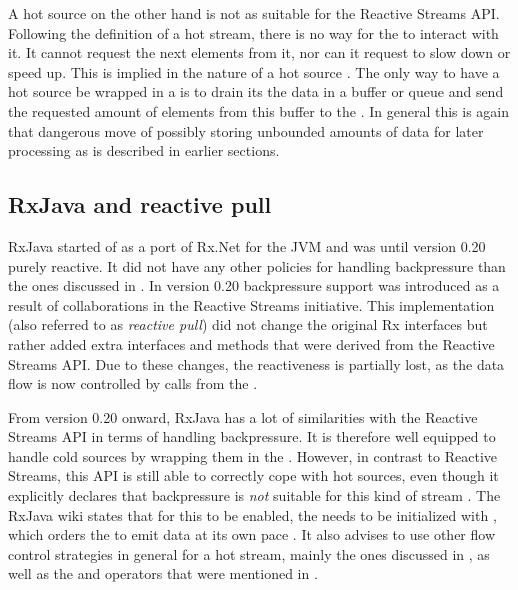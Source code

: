 A hot source on the other hand is not as suitable for the Reactive Streams API. Following the definition of a hot stream, there is no way for the  to interact with it. It cannot request the next  elements from it, nor can it request to slow down or speed up. This is implied in the nature of a hot source \cite{berry1991-Reactive}. The only way to have a hot source be wrapped in a  is to drain its the data in a buffer or queue and send the requested amount of elements from this buffer to the . In general this is again that dangerous move of possibly storing unbounded amounts of data for later processing as is described in earlier sections.

\subsection{RxJava and reactive pull}
\label{subsec:handling-overproduction-with-rxjava}
RxJava started of as a port of Rx.Net for the JVM and was until version 0.20 purely reactive. It did not have any other policies for handling backpressure than the ones discussed in . In version 0.20 backpressure support was introduced as a result of collaborations in the Reactive Streams initiative. This implementation (also referred to as \textit{reactive pull}) did not change the original Rx interfaces but rather added extra interfaces and methods that were derived from the Reactive Streams API. Due to these changes, the reactiveness is partially lost, as the data flow is now controlled by  calls from the \obv.

From version 0.20 onward, RxJava has a lot of similarities with the Reactive Streams API in terms of handling backpressure. It is therefore well equipped to handle cold sources by wrapping them in the \obs. However, in contrast to Reactive Streams, this API is still able to correctly cope with hot sources, even though it explicitly declares that backpressure is \emph{not} suitable for this kind of stream \cite{RxJava-Wiki-HotCold}. The RxJava wiki states that for this to be enabled, the \obs needs to be initialized with , which orders the \obs to emit data at its own pace \cite{RxJava-Wiki-Backpressure}. It also advises to use other flow control strategies in general for a hot stream, mainly the ones discussed in , as well as the  and  operators that were mentioned in .

